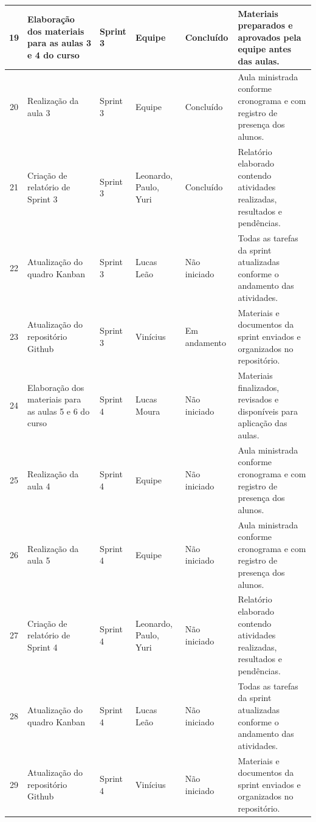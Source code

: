 \documentclass[12pt,a4paper]{article}
\begin{document}
\begin{longtable}{|c|p{3.8cm}|p{1.9cm}|p{2.2cm}|p{1.7cm}|p{4.2cm}|}
19 & Elaboração dos materiais para as aulas 3 e 4 do curso & Sprint 3 & Equipe & Concluído & Materiais preparados e aprovados pela equipe antes das aulas. \\ \hline

20 & Realização da aula 3 & Sprint 3 & Equipe & Concluído & Aula ministrada conforme cronograma e com registro de presença dos alunos. \\ \hline

21 & Criação de relatório de Sprint 3 & Sprint 3 & Leonardo, Paulo, Yuri & Concluído & Relatório elaborado contendo atividades realizadas, resultados e pendências. \\ \hline

22 & Atualização do quadro Kanban & Sprint 3 & Lucas Leão & Não iniciado & Todas as tarefas da sprint atualizadas conforme o andamento das atividades. \\ \hline

23 & Atualização do repositório Github & Sprint 3 & Vinícius & Em andamento & Materiais e documentos da sprint enviados e organizados no repositório. \\ \hline

24 & Elaboração dos materiais para as aulas 5 e 6 do curso & Sprint 4 & Lucas Moura & Não iniciado & Materiais finalizados, revisados e disponíveis para aplicação das aulas. \\ \hline

25 & Realização da aula 4 & Sprint 4 & Equipe & Não iniciado & Aula ministrada conforme cronograma e com registro de presença dos alunos. \\ \hline

26 & Realização da aula 5 & Sprint 4 & Equipe & Não iniciado & Aula ministrada conforme cronograma e com registro de presença dos alunos. \\ \hline

27 & Criação de relatório de Sprint 4 & Sprint 4 & Leonardo, Paulo, Yuri & Não iniciado & Relatório elaborado contendo atividades realizadas, resultados e pendências. \\ \hline

28 & Atualização do quadro Kanban & Sprint 4 & Lucas Leão & Não iniciado & Todas as tarefas da sprint atualizadas conforme o andamento das atividades. \\ \hline

29 & Atualização do repositório Github & Sprint 4 & Vinícius & Não iniciado & Materiais e documentos da sprint enviados e organizados no repositório. \\ \hline


\end{longtable}
\end{document}
